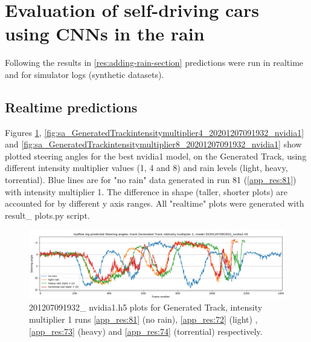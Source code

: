 
\section{Evaluation of self-driving cars using CNNs in the rain}
Following the results in \ref{res:adding-rain-section} predictions were run in realtime and for simulator logs (synthetic datasets).
\subsection{Realtime predictions}

Figures
\ref{fig:sa_GeneratedTrackintensitymultiplier1_20201207091932_nvidia1}, \ref{fig:sa_GeneratedTrackintensitymultiplier4_20201207091932_nvidia1} and
\ref{fig:sa_GeneratedTrackintensitymultiplier8_20201207091932_nvidia1} show plotted steering angles for the best nvidia1 model, on the Generated Track, using different intensity multiplier values (1, 4 and 8) and rain levels (light, heavy, torrential). Blue lines are for "no rain" data generated in run 81 (\ref{app_res:81}) with intensity multiplier 1. The difference in shape (taller, shorter plots) are accounted for by different y axis ranges. All "realtime" plots were generated with result\_ plots.py script.


\begin{figure}[h!]
 \centering 
 \includegraphics[width=\textwidth]{Figures/sa_GeneratedTrackintensitymultiplier1_20201207091932_nvidia1.h5.png}
 \caption{201207091932\_ nvidia1.h5 plots for Generated Track, intensity multiplier 1 runs \ref{app_res:81} (no rain), \ref{app_res:72} (light) , \ref{app_res:73} (heavy) and  \ref{app_res:74} (torrential) respectively.}
 \label{fig:sa_GeneratedTrackintensitymultiplier1_20201207091932_nvidia1} 
\end{figure}

